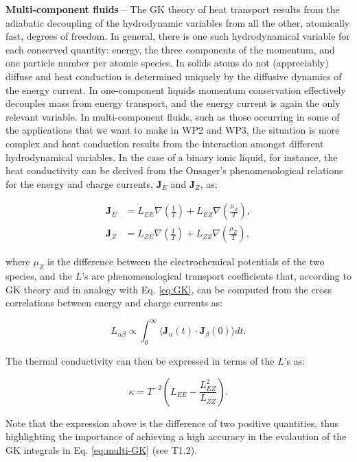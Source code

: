 \smallskip\noindent\textbf{Multi-component fluids} -- The GK theory of heat transport results from the adiabatic decoupling of the hydrodynamic variables from all the other, atomically fast, degrees of freedom. In general, there is one such hydrodynamical variable for each conserved quantity: energy, the three components of the momentum, and one particle number per atomic species. In solids atoms do not (appreciably) diffuse and heat conduction is determined uniquely by the diffusive dynamics of the energy current. In one-component liquids momentum conservation effectively decouples mass from energy transport, and the energy current is again the only relevant variable. In multi-component fluids, such as those occurring in some of the applications that we want to make in WP2 and WP3, the situation is more complex and heat conduction results from the interaction amongst different hydrodynamical variables. In the case of a binary ionic liquid, for instance, the heat conductivity can be derived from the Onsager's phenomenological relations\cite{Onsager1931a,Onsager1931b} for the energy and charge currents, $\mathbf{J}_E$ and $\mathbf{J}_Z$, as:\cite{Salanne2011}
\begin{linenomath}\begin{equation}
\begin{aligned}
\mathbf{J}_E &= L_{EE} \nabla \left ( \frac{1}{T} \right ) + L_{EZ} \nabla \left ( \frac{\mu_Z}{T} \right ), \\
\mathbf{J}_Z &= L_{ZE} \nabla \left ( \frac{1}{T} \right ) + L_{ZZ} \nabla \left ( \frac{\mu_Z}{T} \right ),
\end{aligned}
\label{eq:onsager}
\end{equation}\end{linenomath}
where $\mu_Z$ is the difference between the electrochemical potentials of the two species, and the $L$'s are phenomenological transport coefficients that, according to GK theory and in analogy with Eq. \eqref{eq:GK}, can be computed from the cross correlations between energy and charge currents as:
\begin{linenomath}\begin{equation}
L_{\alpha\beta} \propto \int_0^\infty \langle \mathbf{J}_\alpha(t)\cdot \mathbf{J}_\beta(0)\rangle dt. \label{eq:multi-GK}
\end{equation}\end{linenomath}
The thermal conductivity can then be expressed in terms of the $L$'s as:
\begin{linenomath}\begin{equation}
\kappa =T^{-2} \left ( L_{EE} -\frac{L_{EZ}^2}{L_{ZZ}} \right ). \label{eq:kappa-onsager}
\end{equation}\end{linenomath}
Note that the expression above is the difference of two positive quantities, thus highlighting the importance of achieving a high accuracy in the evalaution of the GK integrals in Eq. \eqref{eq:multi-GK} (see T1.2).

